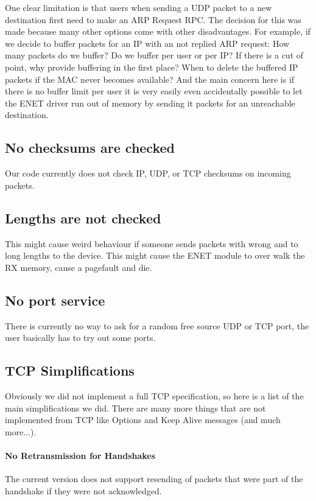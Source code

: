 One clear limitation is that users when sending a UDP packet to a new destination first need to make an ARP Request RPC. The decision for this was made because many other options come with other disadvantages. For example, if we decide to buffer packets for an IP with an not replied ARP request: How many packets do we buffer? Do we buffer per user or per IP? If there is a cut of point, why provide buffering in the first place? When to delete the buffered IP packets if the MAC never becomes available? And the main concern here is if there is no buffer limit per user it is very easily even accidentally possible to let the ENET driver run out of memory by sending it packets for an unreachable destination.

\subsection{No checksums are checked}

Our code currently does not check IP, UDP, or TCP checksums on incoming packets.

\subsection{Lengths are not checked}

This might cause weird behaviour if someone sends packets with wrong and to long lengths to the device. This might cause the ENET module to over walk the RX memory, cause a pagefault and die.

\subsection{No port service}

There is currently no way to ask for a random free source UDP or TCP port, the user basically has to try out some ports.

\subsection{TCP Simplifications}

Obviously we did not implement a full TCP specification, so here is a list of the main simplifications we did. There are many more things that are not implemented from TCP like Options and Keep Alive messages (and much more...).

\paragraph{No Retransmission for Handshakes}
The current version does not support resending of packets that were part of the handshake if they were not acknowledged. 

